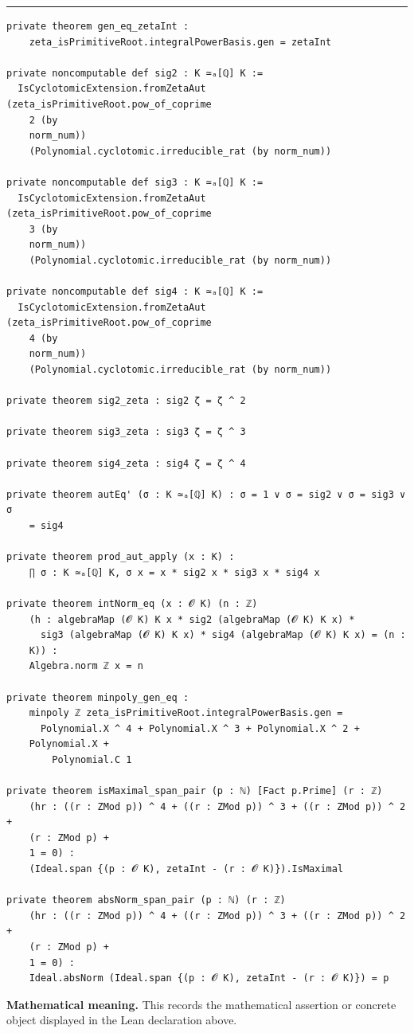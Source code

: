 \documentclass[UTF8,a4paper,11pt,fontset=fandol]{ctexart}
\theoremstyle{definition}
\newcommand{\statementsep}{\par\medskip\hrule\medskip}
\begin{document}
\statementsep
\begin{verbatim}
private theorem gen_eq_zetaInt :
    zeta_isPrimitiveRoot.integralPowerBasis.gen = zetaInt

private noncomputable def sig2 : K ≃ₐ[ℚ] K :=
  IsCyclotomicExtension.fromZetaAut (zeta_isPrimitiveRoot.pow_of_coprime
    2 (by
    norm_num))
    (Polynomial.cyclotomic.irreducible_rat (by norm_num))

private noncomputable def sig3 : K ≃ₐ[ℚ] K :=
  IsCyclotomicExtension.fromZetaAut (zeta_isPrimitiveRoot.pow_of_coprime
    3 (by
    norm_num))
    (Polynomial.cyclotomic.irreducible_rat (by norm_num))

private noncomputable def sig4 : K ≃ₐ[ℚ] K :=
  IsCyclotomicExtension.fromZetaAut (zeta_isPrimitiveRoot.pow_of_coprime
    4 (by
    norm_num))
    (Polynomial.cyclotomic.irreducible_rat (by norm_num))

private theorem sig2_zeta : sig2 ζ = ζ ^ 2

private theorem sig3_zeta : sig3 ζ = ζ ^ 3

private theorem sig4_zeta : sig4 ζ = ζ ^ 4

private theorem autEq' (σ : K ≃ₐ[ℚ] K) : σ = 1 ∨ σ = sig2 ∨ σ = sig3 ∨ σ
    = sig4

private theorem prod_aut_apply (x : K) :
    ∏ σ : K ≃ₐ[ℚ] K, σ x = x * sig2 x * sig3 x * sig4 x

private theorem intNorm_eq (x : 𝓞 K) (n : ℤ)
    (h : algebraMap (𝓞 K) K x * sig2 (algebraMap (𝓞 K) K x) *
      sig3 (algebraMap (𝓞 K) K x) * sig4 (algebraMap (𝓞 K) K x) = (n :
    K)) :
    Algebra.norm ℤ x = n

private theorem minpoly_gen_eq :
    minpoly ℤ zeta_isPrimitiveRoot.integralPowerBasis.gen =
      Polynomial.X ^ 4 + Polynomial.X ^ 3 + Polynomial.X ^ 2 +
    Polynomial.X +
        Polynomial.C 1

private theorem isMaximal_span_pair (p : ℕ) [Fact p.Prime] (r : ℤ)
    (hr : ((r : ZMod p)) ^ 4 + ((r : ZMod p)) ^ 3 + ((r : ZMod p)) ^ 2 +
    (r : ZMod p) +
    1 = 0) :
    (Ideal.span {(p : 𝓞 K), zetaInt - (r : 𝓞 K)}).IsMaximal

private theorem absNorm_span_pair (p : ℕ) (r : ℤ)
    (hr : ((r : ZMod p)) ^ 4 + ((r : ZMod p)) ^ 3 + ((r : ZMod p)) ^ 2 +
    (r : ZMod p) +
    1 = 0) :
    Ideal.absNorm (Ideal.span {(p : 𝓞 K), zetaInt - (r : 𝓞 K)}) = p
\end{verbatim}
\noindent\textbf{Mathematical meaning.} This records the mathematical assertion or concrete object displayed in the Lean declaration above.\par
\end{document}
